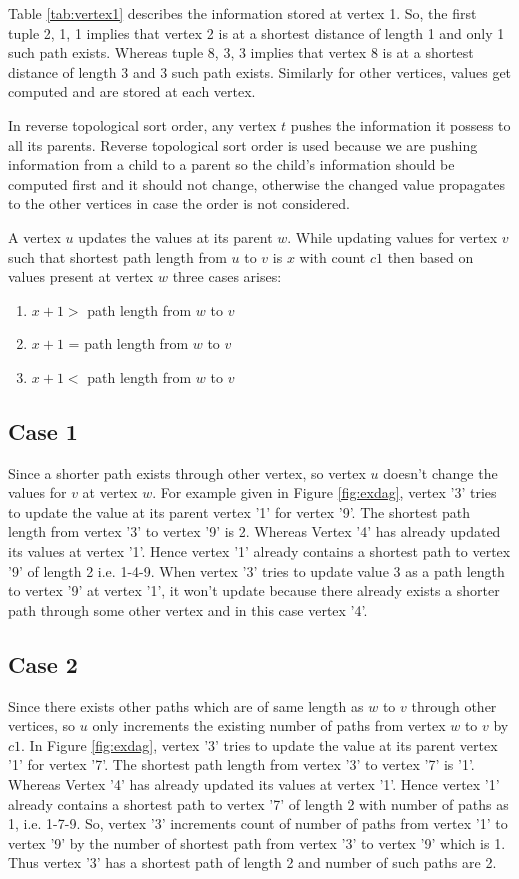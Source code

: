 Table \ref{tab:vertex1} describes the information stored at vertex 1. So, the first tuple 2, 1, 1 implies that vertex 2 is at a shortest distance of length 1 and only 1 such path exists. Whereas tuple 8, 3, 3 implies that vertex 8 is at a shortest distance of length 3 and 3 such path exists. Similarly for other vertices, values get computed and are stored at each vertex.

In reverse topological sort order, any vertex $t$ pushes the information it possess to all its parents. Reverse topological sort order is used because we are pushing information from a child to a parent so the child's information should be computed first and it should not change, otherwise the changed value propagates to the other vertices in case the order is not considered. 

A vertex $u$ updates the values at its parent $w$.
While updating values for vertex $v$ such that shortest path length from $u$ to $v$ is $x$ with count $c1$ then based on values present at vertex $w$ three cases arises:
\begin{enumerate}
\item  $x + 1 >$ path length from $w$ to $v$
\item  $x + 1$ = path length from $w$ to $v$
\item  $x + 1 <$ path length from $w$ to $v$
\end{enumerate}
\vspace{-2.0em}
\subsection{Case 1}
\vspace{-1.0em}
Since a shorter path exists through other vertex, so vertex $u$ doesn't change the values for $v$ at vertex $w$.
For example given in Figure \ref{fig:exdag}, vertex '3' tries to update the value at its parent vertex '1' for vertex '9'. The shortest path length from vertex '3' to vertex '9' is 2. Whereas Vertex '4' has already updated its values at vertex '1'. Hence vertex '1' already contains a shortest path to  vertex '9' of length 2 i.e. 1-4-9. When vertex '3' tries to update value 3 as a path length to vertex '9' at vertex '1', it won't update because there already exists a shorter path through some other vertex and in this case vertex '4'. 

\subsection{Case 2}
Since there exists other paths which are of same length as $w$ to $v$ through other vertices, so $u$ only increments the existing number of paths from vertex $w$ to $v$ by $c1$.
In Figure \ref{fig:exdag}, vertex '3' tries to update the value at its parent vertex '1' for vertex '7'. The shortest path length from vertex '3' to vertex '7' is  '1'. Whereas Vertex '4' has already updated its values at vertex '1'. Hence vertex '1' already contains a shortest path to vertex '7' of length 2 with number of paths as 1, i.e. 1-7-9.
So, vertex '3' increments count of number of paths from vertex '1' to vertex '9' by the number of shortest path from vertex '3' to vertex '9' which is 1. Thus vertex '3' has a shortest path of length 2 and number of such paths are 2.

